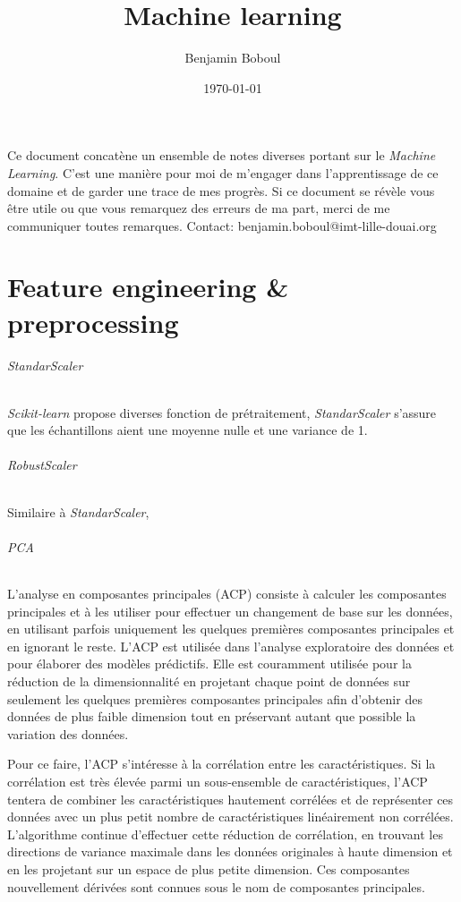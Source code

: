 \documentclass[../../cs-notes.tex]{subfiles}
\title{Machine learning}
\author{Benjamin Boboul}
\date{\today}
\begin{document}
	\maketitle

	Ce document concat\`ene un ensemble de notes diverses portant sur le \textit{Machine Learning}.
	C'est une manière pour moi de m'engager dans l'apprentissage de ce domaine et de garder une trace de mes progrès.
	Si ce document se r\'ev\`ele vous être utile ou que vous remarquez des erreurs de ma part, merci de me communiquer toutes remarques.
	Contact: benjamin.boboul@imt-lille-douai.org

	\part{Feature engineering \& preprocessing}

	\paragraph{StandarScaler} \textit{Scikit-learn} propose diverses fonction de prétraitement, \textit{StandarScaler} s'assure que les échantillons aient une moyenne nulle et une variance de 1.

	\paragraph{RobustScaler} Similaire à \textit{StandarScaler}, 

	\paragraph{PCA} L'analyse en composantes principales (ACP) consiste à calculer les composantes principales et à les utiliser pour effectuer un changement de base sur les données, en utilisant parfois uniquement les quelques premières composantes principales et en ignorant le reste. 
	L'ACP est utilisée dans l'analyse exploratoire des données et pour élaborer des modèles prédictifs.
	Elle est couramment utilisée pour la réduction de la dimensionnalité en projetant chaque point de données sur seulement les quelques premières composantes principales afin d'obtenir des données de plus faible dimension tout en préservant autant que possible la variation des données.

	Pour ce faire, l'ACP s'intéresse à la corrélation entre les caractéristiques. 
	Si la corrélation est très élevée parmi un sous-ensemble de caractéristiques, l'ACP tentera de combiner les caractéristiques hautement corrélées et de représenter ces données avec un plus petit nombre de caractéristiques linéairement non corrélées.
	L'algorithme continue d'effectuer cette réduction de corrélation, en trouvant les directions de variance maximale dans les données originales à haute dimension et en les projetant sur un espace de plus petite dimension.
	Ces composantes nouvellement dérivées sont connues sous le nom de composantes principales.
\end{document}
